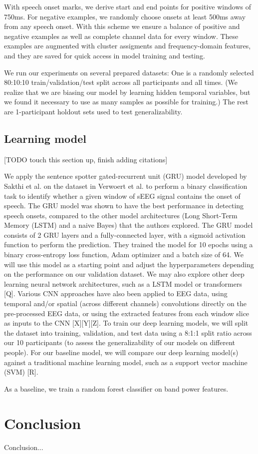 \documentclass[format=sigconf, nonacm=true, review=true, screen=true]{acmart}
\begin{document}
With speech onset marks, we derive start and end points for positive windows of 750ms. For negative examples, we randomly choose onsets at least 500ms away from any speech onset. With this scheme we ensure a balance of positive and negative examples as well as complete channel data for every window. These examples are augmented with cluster assigments and frequency-domain features, and they are saved for quick access in model training and testing.

We run our experiments on several prepared datasets: One is a randomly selected 80:10:10 train/validation/test split across all participants and all times. (We realize that we are biasing our model by learning hidden temporal variables, but we found it necessary to use as many samples as possible for training.) The rest are 1-participant holdout sets used to test generalizability.

\subsection{Learning model}

[TODO touch this section up, finish adding citations]

We apply the sentence spotter gated-recurrent unit (GRU) model developed by Sakthi et al. \cite{sakthi2021keyword} on the dataset in Verwoert et al. \cite{verwoert2022dataset} to perform a binary classification task to identify whether a given window of sEEG signal contains the onset of speech. The GRU model was shown to have the best performance in detecting speech onsets, compared to the other model architectures (Long Short-Term Memory (LSTM) and a naive Bayes) that the authors explored. \cite{sakthi2021keyword} The GRU model consists of 2 GRU layers and a fully-connected layer, with a sigmoid activation function to perform the prediction. \cite{sakthi2021keyword} They trained the model for 10 epochs using a binary cross-entropy loss function, Adam optimizer and a batch size of 64. We will use this model as a starting point and adjust the hyperparameters depending on the performance on our validation dataset. We may also explore other deep learning neural network architectures, such as a LSTM model \cite{sakthi2021keyword} or transformers [Q]. Various CNN approaches have also been applied to EEG data, using temporal and/or spatial (across different channels) convolutions directly on the pre-processed EEG data, or using the extracted features from each window slice as inputs to the CNN [X][Y][Z]. To train our deep learning models, we will split the dataset into training, validation, and test data using a 8:1:1 split ratio across our 10 participants (to assess the generalizability of our models on different people). For our baseline model, we will compare our deep learning model(s) against a traditional machine learning model, such as a support vector machine (SVM) [R].

As a baseline, we train a random forest classifier on band power features.

\section{Conclusion}

Conclusion...



\end{document}
